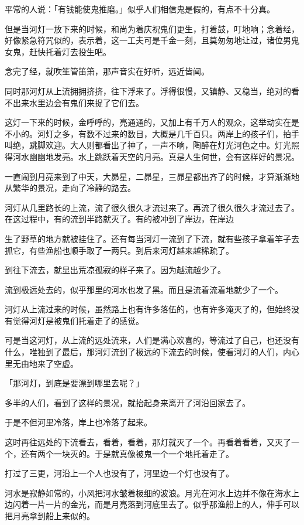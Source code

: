 \documentclass[UTF8]{ctexart}
\begin{document}
平常的人说：「有钱能使鬼推磨。」似乎人们相信鬼是假的，有点不十分真。

但是当河灯一放下来的时候，和尚为着庆祝鬼们更生，打着鼓，叮地响；念着经，好像紧急符咒似的，表示着，这一工夫可是千金一刻，且莫匆匆地让过，诸位男鬼女鬼，赶快托着灯去投生吧。

念完了经，就吹笙管笛箫，那声音实在好听，远近皆闻。

同时那河灯从上流拥拥挤挤，往下浮来了。浮得很慢，又镇静、又稳当，绝对的看不出来水里边会有鬼们来捉了它们去。

这灯一下来的时候，金呼呼的，亮通通的，又加上有千万人的观众，这举动实在是不小的。河灯之多，有数不过来的数目，大概是几千百只。两岸上的孩子们，拍手叫绝，跳脚欢迎。大人则都看出了神了，一声不响，陶醉在灯光河色之中。灯光照得河水幽幽地发亮。水上跳跃着天空的月亮。真是人生何世，会有这样好的景况。

一直闹到月亮来到了中天，大昴星，二昴星，三昴星都出齐了的时候，才算渐渐地从繁华的景况，走向了冷静的路去。

河灯从几里路长的上流，流了很久很久才流过来了。再流了很久很久才流过去了。在这过程中，有的流到半路就灭了。有的被冲到了岸边，在岸边

生了野草的地方就被挂住了。还有每当河灯一流到了下流，就有些孩子拿着竿子去抓它，有些渔船也顺手取了一两只。到后来河灯越来越稀疏了。

到往下流去，就显出荒凉孤寂的样子来了。因为越流越少了。

流到极远处去的，似乎那里的河水也发了黑。而且是流着流着地就少了一个。

河灯从上流过来的时候，虽然路上也有许多落伍的，也有许多淹灭了的，但始终没有觉得河灯是被鬼们托着走了的感觉。

可是当这河灯，从上流的远处流来，人们是满心欢喜的，等流过了自己，也还没有什么，唯独到了最后，那河灯流到了极远的下流去的时候，使看河灯的人们，内心里无由地来了空虚。

「那河灯，到底是要漂到哪里去呢？」

多半的人们，看到了这样的景况，就抬起身来离开了河沿回家去了。

于是不但河里冷落，岸上也冷落了起来。

这时再往远处的下流看去，看着，看着，那灯就灭了一个。再看着看着，又灭了一个，还有两个一块灭的。于是就真像被鬼一个一个地托着走了。

打过了三更，河沿上一个人也没有了，河里边一个灯也没有了。

河水是寂静如常的，小风把河水皱着极细的波浪。月光在河水上边并不像在海水上边闪着一片一片的金光，而是月亮落到河底里去了。似乎那渔船上的人，伸手可以把月亮拿到船上来似的。
\end{document}
